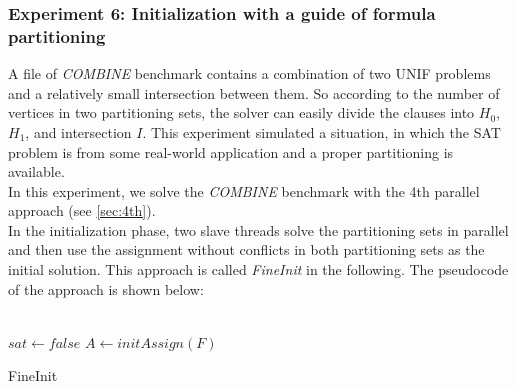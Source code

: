 \documentclass[12pt,a4paper,twoside]{scrartcl}
\numberwithin{equation}{section}
\begin{document}
\subsubsection{Experiment 6: Initialization with a guide of formula partitioning} 
\label{sec:Experiment 6}
A file of  \emph{COMBINE}  benchmark contains a combination of two UNIF problems and a relatively small intersection between them. So according to the number of vertices in two partitioning sets, the solver can easily divide the clauses into $H_0$, $H_1$, and intersection $I$. 
This experiment simulated a situation, in which the SAT problem is from some real-world application and a proper partitioning is available. \\
In this experiment, we solve the \emph{COMBINE} benchmark with the 4th parallel approach (see \ref{sec:4th}).\\ In the initialization phase, two slave threads solve the partitioning sets in parallel and then use the assignment without conflicts in both partitioning sets as the initial solution. This approach is called \emph{FineInit} in the following.
The pseudocode of the approach is shown below:\\
\\
\begin{algorithm}[H]
  $sat \leftarrow false$\;
  $A \leftarrow initAssign(F)$\;
 \caption{FineInit}
\end{algorithm}  
\end{document}
